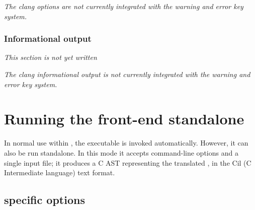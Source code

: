 \textit{The clang options are not currently integrated with the \fc warning and error key system.}

\subsection{Informational output}

\textit{This section is not yet written}

\textit{The clang informational output is not currently integrated with the \fc warning and error key system.}

\chapter{Running the \fclang front-end standalone}
\label{sec:standalone}

In normal use within \framac, the \irg executable is
invoked automatically. However, it can also be run standalone.
In this mode it accepts command-line options and a single input file;
it produces a C AST representing the translated \cpp, in the Cil (C Intermediate language) text format.


\section{\irg specific options}
\label{sec:fcloptions}

